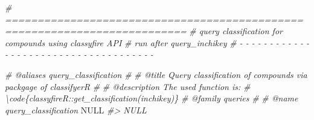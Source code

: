 \documentclass[
]{article}
\newenvironment{Shaded}{\begin{snugshade}}{\end{snugshade}}
\newcommand{\CommentTok}[1]{\textcolor[rgb]{0.56,0.35,0.01}{\textit{#1}}}
\newcommand{\ConstantTok}[1]{\textcolor[rgb]{0.00,0.00,0.00}{#1}}
\begin{document}
\begin{Shaded}
\begin{Highlighting}[]
\CommentTok{\# ==========================================================================}
\CommentTok{\# query classification for compounds using classyfire API}
\CommentTok{\# run after query\_inchikey}
\CommentTok{\# {-} {-} {-} {-} {-} {-} {-} {-} {-} {-} {-} {-} {-} {-} {-} {-} {-} {-} {-} {-} {-} {-} {-} {-} {-} {-} {-} {-} {-} {-} {-} {-} {-} {-} {-} {-} {-}}

\CommentTok{\#\textquotesingle{} @aliases query\_classification}
\CommentTok{\#\textquotesingle{}}
\CommentTok{\#\textquotesingle{} @title Query classification of compounds via packgage of \textquotesingle{}classifyerR\textquotesingle{}}
\CommentTok{\#\textquotesingle{}}
\CommentTok{\#\textquotesingle{} @description The used function is:}
\CommentTok{\#\textquotesingle{} \textbackslash{}code\{classyfireR::get\_classification(inchikey)\}}
\CommentTok{\#\textquotesingle{} @family queries}
\CommentTok{\#\textquotesingle{}}
\CommentTok{\#\textquotesingle{} @name query\_classification}
\ConstantTok{NULL}
\CommentTok{\#\textgreater{} NULL}


\end{Highlighting}
\end{Shaded}
\end{document}

